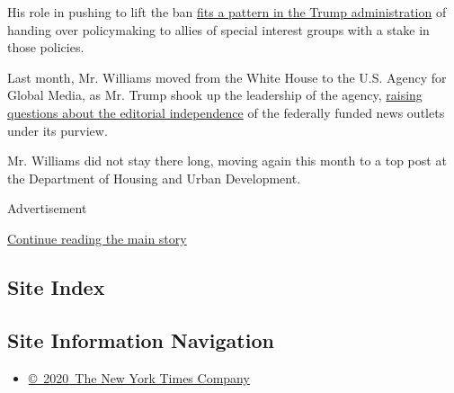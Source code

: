 His role in pushing to lift the ban
\href{https://www.nytimes.com/2019/10/18/climate/trump-cabinet-lobbyists.html}{fits
a pattern in the Trump administration} of handing over policymaking to
allies of special interest groups with a stake in those policies.

Last month, Mr. Williams moved from the White House to the U.S. Agency
for Global Media, as Mr. Trump shook up the leadership of the agency,
\href{https://www.nytimes.com/2020/06/17/us/politics/michael-pack-media-agency.html}{raising
questions about the editorial independence} of the federally funded news
outlets under its purview.

Mr. Williams did not stay there long, moving again this month to a top
post at the Department of Housing and Urban Development.

Advertisement

\protect\hyperlink{after-bottom}{Continue reading the main story}

\hypertarget{site-index}{%
\subsection{Site Index}\label{site-index}}

\hypertarget{site-information-navigation}{%
\subsection{Site Information
Navigation}\label{site-information-navigation}}

\begin{itemize}
\tightlist
\item
  \href{https://help.nytimes.com/hc/en-us/articles/115014792127-Copyright-notice}{©~2020~The
  New York Times Company}
\end{itemize}

